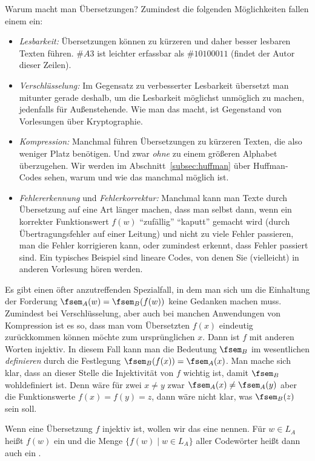 Warum macht man Übersetzungen? 
%
Zumindest die folgenden Möglichkeiten fallen einem ein:
\begin{itemize}
\item \emph{Lesbarkeit:} Übersetzungen können zu kürzeren und daher
  besser lesbaren Texten führen. 
  $\#{A3}$ ist leichter erfassbar als $\#{10100011}$
  (findet der Autor dieser Zeilen).
\item \emph{Verschlüsselung:} Im Gegensatz zu verbesserter Lesbarkeit
  übersetzt man mitunter gerade deshalb, um die Lesbarkeit möglichst
  unmöglich zu machen, jedenfalls für Außenstehende. 
  Wie man das macht, ist Gegenstand von Vorlesungen über
  Kryptographie.
\item \emph{Kompression:} Manchmal führen Übersetzungen zu kürzeren
  Texten, die also weniger Platz benötigen. 
  Und zwar \emph{ohne} zu einem größeren Alphabet überzugehen. 
  Wir werden im Abschnitt~\ref{subsec:huffman} über Huffman-Codes
  sehen, warum und wie das manchmal möglich ist.
\item \emph{Fehlererkennung} und \emph{Fehlerkorrektur:} Manchmal kann
  man Texte durch Übersetzung auf eine Art länger machen, dass man
  selbst dann, wenn ein korrekter Funktionswert $f(w)$ "`zufällig"'
  "`kaputt"' gemacht wird (\zB durch Übertragungsfehler auf einer
  Leitung) und nicht zu viele Fehler passieren, man die Fehler
  korrigieren kann, oder zumindest erkennt, dass Fehler passiert sind.
  Ein typisches Beispiel sind lineare Codes, von denen Sie
  (vielleicht) in anderen Vorlesung hören werden.
\end{itemize}
%
Es gibt einen öfter anzutreffenden Spezialfall, in dem man sich um die
Einhaltung der Forderung $\fsem_A(w) = \fsem_B(f(w))$
keine Gedanken machen muss. 
%
Zumindest bei Verschlüsselung, aber auch bei manchen Anwendungen von
Kompression ist es so, dass man vom Übersetzten $f(x)$
eindeutig zurückkommen können möchte zum ursprünglichen $x$.
%
Dann ist $f$ mit anderen Worten injektiv.
%
In diesem Fall kann man die Bedeutung $\fsem_B$ im wesentlichen
\emph{definieren} durch die Festlegung $\fsem_B(f(x)) = \fsem_A(x)$.
%
Man mache sich klar, dass an dieser Stelle die Injektivität von $f$
wichtig ist, damit $\fsem_B$ wohldefiniert ist.
%
Denn wäre für zwei $x\not= y$ zwar $\fsem_A(x)\not=\fsem_A(y)$ aber
die Funktionswerte $f(x)=f(y)=z$, dann wäre nicht klar, was
$\fsem_B(z)$ sein soll.

Wenn eine Übersetzung  $f$ injektiv ist, wollen wir das eine
 nennen.
%
Für $w\in L_A$
heißt $f(w)$
ein  und die Menge
$\{ f(w)\mid w\in L_A\}$
aller Codewörter heißt dann auch ein .

